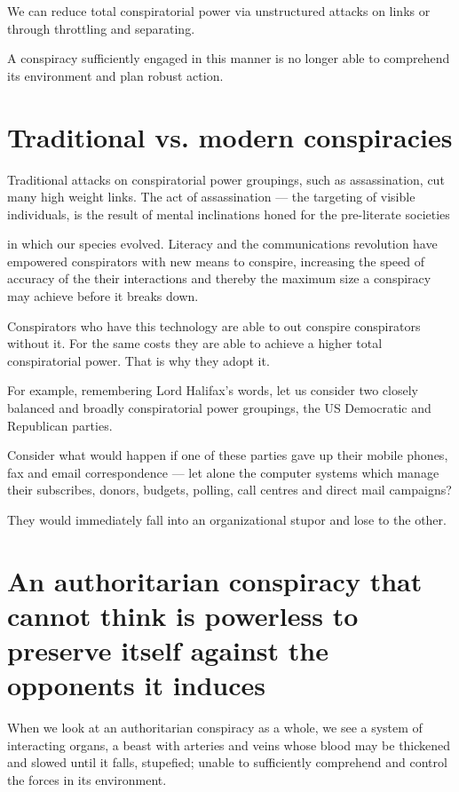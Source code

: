 \documentclass[letterpaper,12pt,english]{sphinxmanual}
\begin{document}
We can reduce total conspiratorial power via unstructured attacks on links or through throttling and separating.

A conspiracy sufficiently engaged in this manner is no longer able to comprehend its environment and plan robust action.


\section{Traditional vs. modern conspiracies}
\label{assange:traditional-vs-modern-conspiracies}
Traditional attacks on conspiratorial power groupings, such as assassination, cut many high weight links. The act of assassination — the targeting of visible individuals, is the result of mental inclinations honed for the pre-literate societies

in which our species evolved.
Literacy and the communications revolution have empowered conspirators with new means to conspire, increasing the speed of accuracy of the their interactions and thereby the maximum size a conspiracy may achieve before it breaks down.

Conspirators who have this technology are able to out conspire conspirators without it. For the same costs they are able to achieve a higher total conspiratorial power. That is why they adopt it.

For example, remembering Lord Halifax’s words, let us consider two closely balanced and broadly conspiratorial power groupings, the US Democratic and Republican parties.

Consider what would happen if one of these parties gave up their mobile phones, fax and email correspondence — let alone the computer systems which manage their subscribes, donors, budgets, polling, call centres and direct mail campaigns?

They would immediately fall into an organizational stupor and lose to the other.


\section{An authoritarian conspiracy that cannot think is powerless to preserve itself against the opponents it induces}
\label{assange:an-authoritarian-conspiracy-that-cannot-think-is-powerless-to-preserve-itself-against-the-opponents-it-induces}
When we look at an authoritarian conspiracy as a whole, we see a system of interacting organs, a beast with arteries and veins whose blood may be thickened and slowed until it falls, stupefied; unable to sufficiently comprehend and control the forces in its environment.
\end{document}

